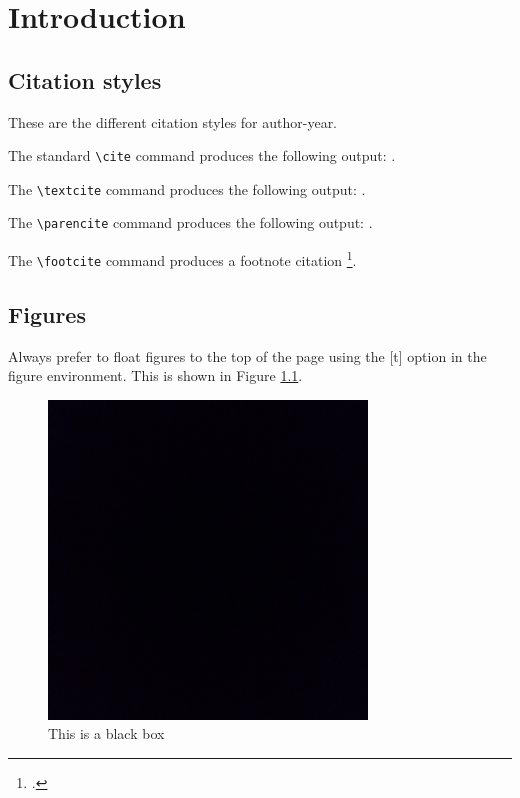 \chapter{Introduction}
\label{chap:introduction}

\section{Citation styles}

These are the different citation styles for author-year.

The standard \verb=\cite= command produces the following output: \cite{clarke1990rendezvous}.

The \verb=\textcite= command produces the following output: \textcite{clarke1990rendezvous}.


The \verb=\parencite= command produces the following output: \parencite{clarke1990rendezvous}.

The \verb=\footcite= command produces a footnote citation \footcite{clarke1990rendezvous}.

\clearpage          %

\section{Figures}

Always prefer to float figures to the top of the page using the [t] option in the figure environment. This is 
shown in Figure \ref{fig:fig_1}.

\begin{figure}[t]
    \centering
    \includegraphics[width=.4\textwidth]{figures/blackbox.jpeg}
    \caption{This is a black box}
    \label{fig:fig_1}
\end{figure}

